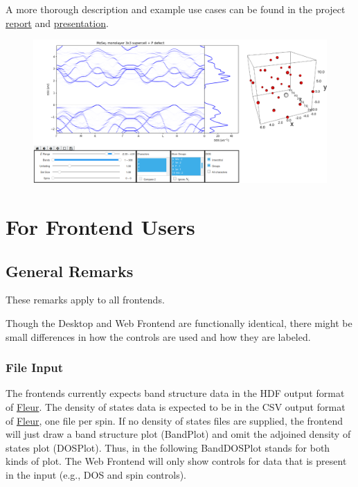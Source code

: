 A more thorough description and example use cases can be found in the
project \href{./doc/report.pdf}{report} and
\href{./doc/presentation.pdf}{presentation}.

\begin{figure}
    \centering
    \includegraphics{./readme/web_frontend.png}
\end{figure}

\section{For Frontend Users}\label{for-frontend-users}

\subsection{General Remarks}\label{general-remarks}

These remarks apply to all frontends.

Though the Desktop and Web Frontend are functionally identical, there
might be small differences in how the controls are used and how they are
labeled.

\subsubsection{File Input}\label{file-input}

The frontends currently expects band structure data in the HDF output
format of \href{http://www.judft.de}{Fleur}. The density of states data
is expected to be in the CSV output format of
\href{http://www.judft.de}{Fleur}, one file per spin. If no density of
states files are supplied, the frontend will just draw a band structure
plot (BandPlot) and omit the adjoined density of states plot (DOSPlot).
Thus, in the following BandDOSPlot stands for both kinds of plot. The
Web Frontend will only show controls for data that is present in the
input (e.g., DOS and spin controls).


